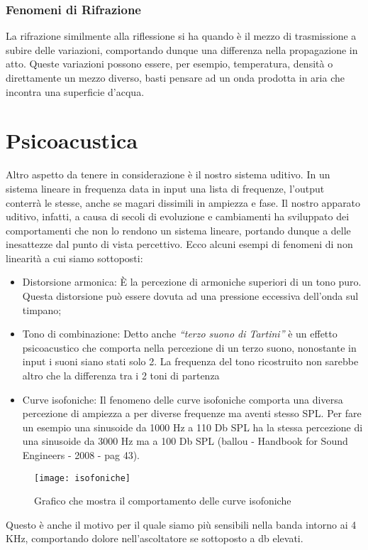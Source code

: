 \subsubsection{Fenomeni di Rifrazione}

La rifrazione similmente alla riflessione si ha quando è il mezzo di trasmissione a subire delle variazioni, comportando dunque una differenza nella propagazione in atto. Queste variazioni possono essere, per esempio, temperatura, densità o direttamente un mezzo diverso, basti pensare ad un onda prodotta in aria che incontra una superficie d’acqua.

\section{Psicoacustica}

Altro aspetto da tenere in considerazione è il nostro sistema uditivo. In un sistema lineare in frequenza data in input una lista di frequenze, l’output conterrà le stesse, anche se magari dissimili in ampiezza e fase.
Il nostro apparato uditivo, infatti, a causa di secoli di evoluzione e cambiamenti ha sviluppato dei comportamenti che non lo rendono un sistema lineare, portando dunque a delle inesattezze dal punto di vista percettivo.
Ecco alcuni esempi di fenomeni di non linearità a cui siamo sottoposti:

\begin{itemize}
\item Distorsione armonica:
È la percezione di armoniche superiori di un tono puro. Questa distorsione può essere dovuta ad una pressione eccessiva dell’onda sul timpano;
\item Tono di combinazione:
Detto anche \textit{“terzo suono di Tartini”} è un effetto psicoacustico che comporta nella percezione di un terzo suono, nonostante in input i suoni siano stati solo 2.
La frequenza del tono ricostruito non sarebbe altro che la differenza tra i 2 toni di partenza
\item Curve isofoniche:
Il fenomeno delle curve isofoniche comporta una diversa percezione di ampiezza a per diverse frequenze ma aventi stesso SPL. Per fare un esempio una sinusoide da 1000 Hz a 110 Db SPL ha la stessa percezione di una sinusoide da 3000 Hz ma a 100 Db SPL (ballou - Handbook for Sound Engineers - 2008 - pag 43).
\end{itemize}
\begin{figure}
\centering
\texttt{[image: isofoniche]}
\caption{Grafico che mostra il comportamento delle curve isofoniche}
\label{fig:isofoniche}
\end{figure}
Questo è anche il motivo per il quale siamo più sensibili nella banda intorno ai 4 KHz, comportando dolore nell’ascoltatore se sottoposto a db elevati.
